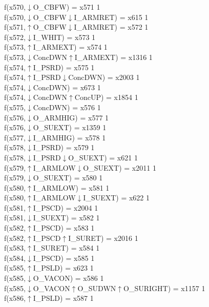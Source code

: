 f(x570,$\downarrow$O\_CBFW) = x571 {1} \\
f(x570,$\downarrow$O\_CBFW$\downarrow$I\_ARMRET) = x615 {1} \\
f(x571,$\uparrow$O\_CBFW$\downarrow$I\_ARMRET) = x572 {1} \\
f(x572,$\downarrow$I\_WHIT) = x573 {1} \\
f(x573,$\uparrow$I\_ARMEXT) = x574 {1} \\
f(x573,$\downarrow$ConcDWN$\uparrow$I\_ARMEXT) = x1316 {1} \\
f(x574,$\uparrow$I\_PSRD) = x575 {1} \\
f(x574,$\uparrow$I\_PSRD$\downarrow$ConcDWN) = x2003 {1} \\
f(x574,$\downarrow$ConcDWN) = x673 {1} \\
f(x574,$\downarrow$ConcDWN$\uparrow$ConcUP) = x1854 {1} \\
f(x575,$\downarrow$ConcDWN) = x576 {1} \\
f(x576,$\downarrow$O\_ARMHIG) = x577 {1} \\
f(x576,$\downarrow$O\_SUEXT) = x1359 {1} \\
f(x577,$\downarrow$I\_ARMHIG) = x578 {1} \\
f(x578,$\downarrow$I\_PSRD) = x579 {1} \\
f(x578,$\downarrow$I\_PSRD$\downarrow$O\_SUEXT) = x621 {1} \\
f(x579,$\uparrow$I\_ARMLOW$\downarrow$O\_SUEXT) = x2011 {1} \\
f(x579,$\downarrow$O\_SUEXT) = x580 {1} \\
f(x580,$\uparrow$I\_ARMLOW) = x581 {1} \\
f(x580,$\uparrow$I\_ARMLOW$\downarrow$I\_SUEXT) = x622 {1} \\
f(x581,$\uparrow$I\_PSCD) = x2004 {1} \\
f(x581,$\downarrow$I\_SUEXT) = x582 {1} \\
f(x582,$\uparrow$I\_PSCD) = x583 {1} \\
f(x582,$\uparrow$I\_PSCD$\uparrow$I\_SURET) = x2016 {1} \\
f(x583,$\uparrow$I\_SURET) = x584 {1} \\
f(x584,$\downarrow$I\_PSCD) = x585 {1} \\
f(x585,$\uparrow$I\_PSLD) = x623 {1} \\
f(x585,$\downarrow$O\_VACON) = x586 {1} \\
f(x585,$\downarrow$O\_VACON$\uparrow$O\_SUDWN$\uparrow$O\_SURIGHT) = x1157 {1} \\
f(x586,$\uparrow$I\_PSLD) = x587 {1} \\
